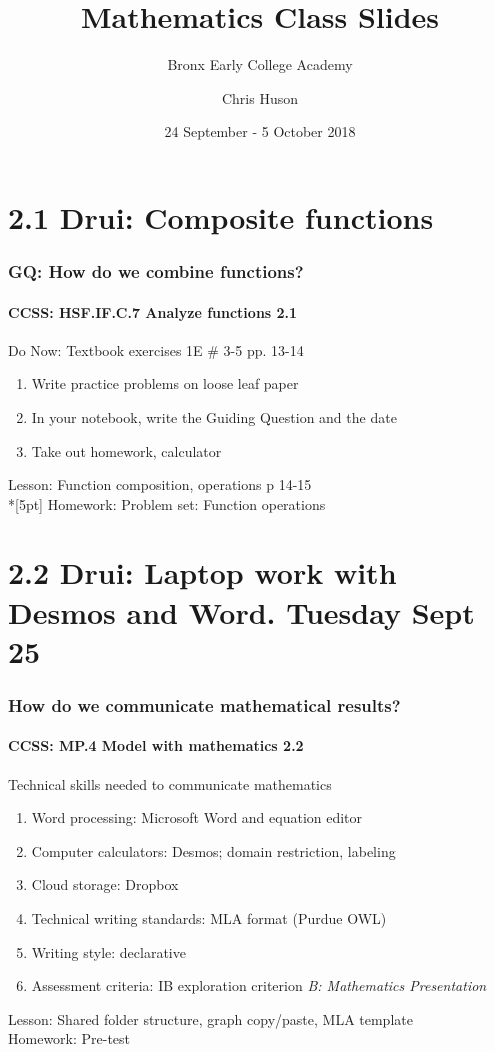 \documentclass{beamer}
\title{Mathematics Class Slides}
\subtitle{Bronx Early College Academy}
\author{Chris Huson}
\date{24 September - 5 October 2018}
\begin{document}
\frame{\titlepage}

\section[Outline]{}
\frame{\tableofcontents}

\section{2.1 Drui: Composite functions} %
  \frame
  {
    \frametitle{GQ: How do we combine functions?}
    \framesubtitle{CCSS: HSF.IF.C.7 Analyze functions    \alert{2.1}}

    \begin{block}{Do Now: Textbook exercises 1E \# 3-5 pp. 13-14}
    \begin{enumerate}
        \item Write practice problems on loose leaf paper
        \item In your notebook, write the Guiding Question and the date
        \item Take out homework, calculator
    \end{enumerate}
    \end{block}
    Lesson: Function composition, operations p 14-15 \\*[5pt]
    Homework: Problem set: Function operations
  }

\section{2.2 Drui: Laptop work with Desmos and Word. Tuesday Sept 25}
  \frame
  {
    \frametitle{How do we communicate mathematical results?}
    \framesubtitle{CCSS: MP.4 Model with mathematics  \alert{2.2}}

    \begin{block}{Technical skills needed to communicate mathematics}
    \begin{enumerate}
        \item Word processing: Microsoft Word and equation editor
        \item Computer calculators: Desmos; domain restriction, labeling
        \item Cloud storage: Dropbox
        \item Technical writing standards: MLA format (Purdue OWL)
        \item Writing style: declarative
        \item Assessment criteria: IB exploration criterion \emph{B: Mathematics Presentation}
    \end{enumerate}
    \end{block}
    Lesson: Shared folder structure, graph copy/paste, MLA template\\ \bigskip
    Homework: Pre-test
  }
\end{document}
